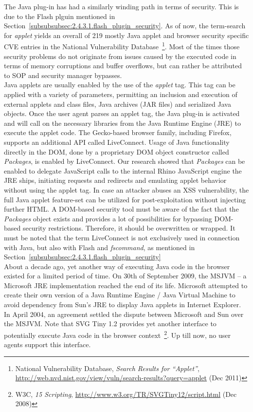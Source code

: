       The Java plug-in has had a similarly winding path in terms of security. This is due to the Flash plguin mentioned in Section~\ref{subsubsubsec:2.4.3.1.flash_plugin_security}. As of now, the term-search for  \textit{applet} yields an overall of 219 mostly Java applet and browser security specific CVE entries in the National Vulnerability Database~\footnote{National Vulnerability Database, \textit{Search Results for ``Applet''}, \url{http://web.nvd.nist.gov/view/vuln/search-results?query=applet} (Dec 2011)}. Most of the times those security problems do not originate from issues caused by the executed code in terms of memory corruptions and buffer overflows, but can rather be attributed to SOP and security manager bypasses.\\

      Java applets are usually enabled by the use of the \textit{applet} tag. This tag can be applied with a variety of parameters, permitting an inclusion and execution of external applets and class files, Java archives (JAR files) and serialized Java objects. Once the user agent parses an applet tag, the Java plug-in is activated and will call on the necessary libraries from the Java Runtime Engine (JRE) to execute the applet code. The Gecko-based browser family, including Firefox, supports an additional API called LiveConnect. Usage of Java functionality directly in the DOM, done by a proprietary DOM object constructor called \textit{Packages}, is enabled by LiveConnect. Our research showed that \textit{Packages} can be enabled to delegate JavaScript calls to the internal Rhino JavaScript engine the JRE ships, initiating requests and redirects and emulating applet behavior without using the applet tag. In case an attacker abuses an XSS vulnerability, the full Java applet feature-set can be utilized for 
post-exploitation without injecting further HTML. A DOM-based security tool must be aware of the fact that the \textit{Packages} object exists and provides a lot of possibilities for bypassing DOM-based security restrictions. Therefore, it should be overwritten or wrapped. It must be noted that the term LiveConnect is not exclusively used in connection with Java, but also with Flash and \textit{fscommand}, as mentioned in Section~\ref{subsubsubsec:2.4.3.1.flash_plugin_security}\\

      About a decade ago, yet another way of executing Java code in the browser existed for a limited period of time. On 30th of September 2009, the MSJVM -- a Microsoft JRE implementation reached the end of its life. Microsoft attempted to create their own version of a Java Runtime Engine / Java Virtual Machine to avoid dependency from Sun's JRE to display Java applets in Internet Explorer. In April 2004, an agreement settled the dispute between Microsoft and Sun over the MSJVM. Note that SVG Tiny 1.2 provides yet another interface to potentially execute Java code in the browser context~\footnote{W3C, \textit{15 Scripting}, \url{http://www.w3.org/TR/SVGTiny12/script.html} (Dec 2008)}. Up till now, no user agents support this interface.\\ 

